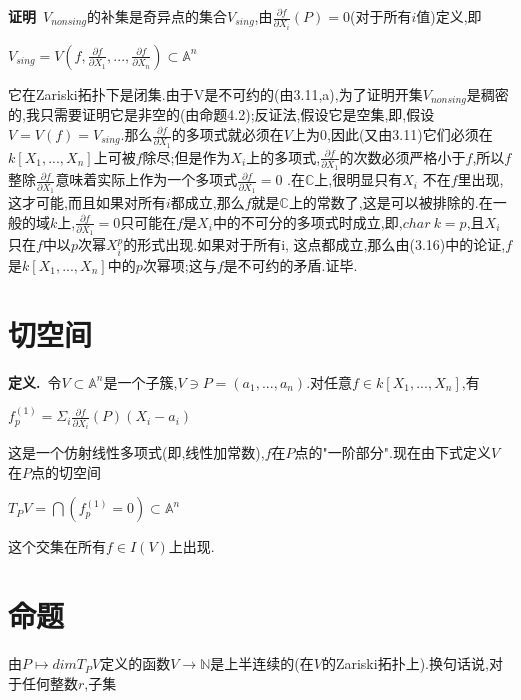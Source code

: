 \documentclass[UTF8]{book}
\begin{document}
\textbf{证明}\ $V_{nonsing}$的补集是奇异点的集合$V_{sing}$,由$\frac{\partial f}{\partial X_{i}}(P)=0$(对于所有$ i $值)定义,即


\begin{center}
	$V_{sing}=V(f,\frac{\partial f}{\partial X_{1}},...,\frac{\partial f}{\partial X_{n}})\subset \mathbb{A}^{n}$
\end{center}


它在Zariski拓扑下是闭集.由于V是不可约的(由3.11,a),为了证明开集$V_{nonsing}$是稠密的,我只需要证明它是非空的(由命题4.2);反证法,假设它是空集,即,假设$V=V(f)=V_{sing}$.那么$\frac{\partial f}{\partial X_{1}}$的多项式就必须在$ V $上为0,因此(又由3.11)它们必须在$k[X_{1},...,X_{n}]$上可被$ f $除尽;但是作为$X_{i}$上的多项式,$\frac{\partial f}{\partial X_{1}}$的次数必须严格小于$ f $,所以$ f $整除$\frac{\partial f}{\partial X_{1}}$意味着实际上作为一个多项式$\frac{\partial f}{\partial X_{1}}=0$ .在$\mathbb{C}$上,很明显只有$X_{i}$ 不在$ f $里出现,这才可能,而且如果对所有$ i $都成立,那么$ f $就是$\mathbb{C}$上的常数了,这是可以被排除的.在一般的域$ k $上,$\frac{\partial f}{\partial X_{1}}=0$只可能在$ f $是$X_{i}$中的不可分的多项式时成立,即,$ char\ k=p $,且$X_{i}$只在$ f $中以$ p $次幂$X_{i}^{p}$的形式出现.如果对于所有i, 这点都成立,那么由(3.16)中的论证,$ f $是$k[X_{1},...,X_{n}]$中的$ p $次幂项;这与$ f $是不可约的矛盾.证毕.


\section{切空间}
\textbf{定义.}\ 令$V\subset \mathbb{A}^{n}$是一个子簇,$V\ni P=(a_{1},...,a_{n})$.对任意$f\in k[X_{1},...,X_{n}]$,有


\begin{center}
	$f_{p}^{(1)}=\Sigma_{i}\frac{\partial f}{\partial X_{i}}(P)(X_{i}-a_{i})$
\end{center}


这是一个仿射线性多项式(即,线性加常数),$ f $在$ P $点的"一阶部分".现在由下式定义$ V $在$ P $点的切空间


\begin{center}
	$T_{P}V = \bigcap(f_{p}^{(1)}=0)\subset \mathbb{A}^{n}$
\end{center}


这个交集在所有$f\in I(V)$上出现.


\section{命题}
由$P\mapsto dim T_{P}V$定义的函数$V\rightarrow \mathbb{N}$是上半连续的(在$ V $的Zariski拓扑上).换句话说,对于任何整数$ r $,子集
\end{document}
